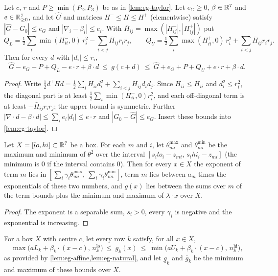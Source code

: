 \begin{lemma}\label{lem:eg-affine}
Let $c$, $r$ and $P\ge\min(P_2,P_3)$ be as in \cref{lem:eg-taylor}.
Let $e_G\ge0$, $\beta\in\mathbb{R}^7$ and $e\in\mathbb{R}^7_{\ge0}$, and let $\hat G$ and matrices $H^-\le H\le H^+$ (elementwise) satisfy $|\hat G-G_0|\le e_G$ and $|\nabla_i-\beta_i|\le e_i$.
With $\bar H_{ij}=\max(|H^-_{ij}|,|H^+_{ij}|)$ put
\begin{equation*}
  Q_L=\tfrac12\sum_i\min(H^-_{ii},0)\,r_i^2-\sum_{i<j}\bar H_{ij}r_ir_j,\qquad
  Q_U=\tfrac12\sum_i\max(H^+_{ii},0)\,r_i^2+\sum_{i<j}\bar H_{ij}r_ir_j .
\end{equation*}
Then for every $d$ with $|d_i|\le r_i$,
\begin{equation*}
  \hat G-e_G-P+Q_L-e\cdot r+\beta\cdot d\ \le\ g(c+d)\ \le\ \hat G+e_G+P+Q_U+e\cdot r+\beta\cdot d .
\end{equation*}
\end{lemma}

\begin{proof}
Write $\frac12d^\top Hd=\frac12\sum_iH_{ii}d_i^2+\sum_{i<j}H_{ij}d_id_j$.
Since $H^-_{ii}\le H_{ii}$ and $d_i^2\le r_i^2$, the diagonal part is at least $\frac12\sum_i\min(H^-_{ii},0)r_i^2$, and each off-diagonal term is at least $-\bar H_{ij}r_ir_j$; the upper bound is symmetric.
Further $|\nabla\cdot d-\beta\cdot d|\le\sum_ie_i|d_i|\le e\cdot r$ and $|G_0-\hat G|\le e_G$.
Insert these bounds into \cref{lem:eg-taylor}.
\end{proof}

\begin{lemma}\label{lem:eg-natural}
Let $X=[lo,hi]\subset\mathbb{R}^7$ be a box.
For each $m$ and $i$, let $\theta^{\max}_{mi}$ and $\theta^{\min}_{mi}$ be the maximum and minimum of $\theta^2$ over the interval $[s_ilo_i-z_{mi},\,s_ihi_i-z_{mi}]$ (the minimum is 0 if the interval contains 0).
Then for every $x\in X$ the exponent of term $m$ lies in $[\sum_i\gamma_i\theta^{\max}_{mi},\ \sum_i\gamma_i\theta^{\min}_{mi}]$, term $m$ lies between $a_m$ times the exponentials of these two numbers, and $g(x)$ lies between the sums over $m$ of the term bounds plus the minimum and maximum of $\lambda\cdot x$ over $X$.
\end{lemma}

\begin{proof}
The exponent is a separable sum, $s_i>0$, every $\gamma_i$ is negative and the exponential is increasing.
\end{proof}

For a box $X$ with centre $c$, let every row $k$ satisfy, for all $x\in X$,
\begin{equation}\label{eq:eg-rowbounds}
  \max\bigl(aL_k+\beta_k\cdot(x-c),\,n^{\mathrm{lo}}_k\bigr)\ \le\ g_k(x)\ \le\ \min\bigl(aU_k+\beta_k\cdot(x-c),\,n^{\mathrm{hi}}_k\bigr),
\end{equation}
as provided by \cref{lem:eg-affine,lem:eg-natural}, and let $\underline g_k$ and $\overline g_k$ be the minimum and maximum of these bounds over $X$.

